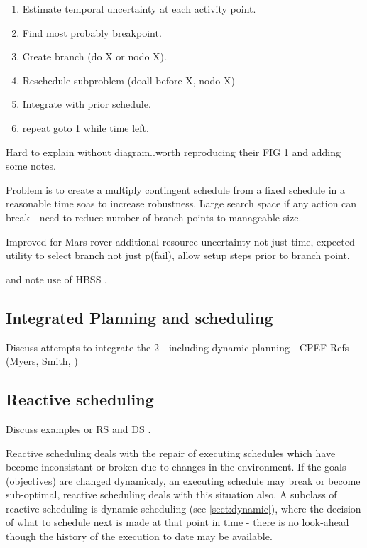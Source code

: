 \begin{enumerate}
\item Estimate temporal uncertainty at each activity point.
\item Find most probably breakpoint.
\item Create branch (do X or nodo X).
\item Reschedule subproblem (doall before X, nodo X)
\item Integrate with prior schedule.
\item repeat goto 1 while time left.
\end{enumerate}

Hard to explain without diagram..worth reproducing their FIG 1 and adding some notes.


 Problem is to create a multiply contingent schedule from a fixed schedule in a reasonable time soas to increase robustness. Large search space if any action can break - need to reduce number of branch points to manageable size. 

 Improved for Mars rover \cite{bresina99increased} additional resource uncertainty not just time, expected utility to select branch not just p(fail), allow setup steps prior to branch point.

and note use of HBSS \cite{bresina96hbss}.
 
%
%
\subsection{Integrated Planning and scheduling}
Discuss attempts to integrate the 2 - including dynamic planning - CPEF 
Refs - (Myers, Smith, ) \cite{chien98integrated}

\cite{myers01integrating} 




\subsection{Reactive scheduling}
Discuss examples or RS and DS .

Reactive scheduling deals with the repair of executing schedules which have become inconsistant or broken due to changes in the environment. If the goals (objectives) are changed dynamicaly, an executing schedule may break or become sub-optimal, reactive scheduling deals with this situation also. A subclass of reactive scheduling is dynamic scheduling (see \ref{sect:dynamic}), where the decision of what to schedule next is made at that point in time - there is no look-ahead though the history of the execution to date may be available.

